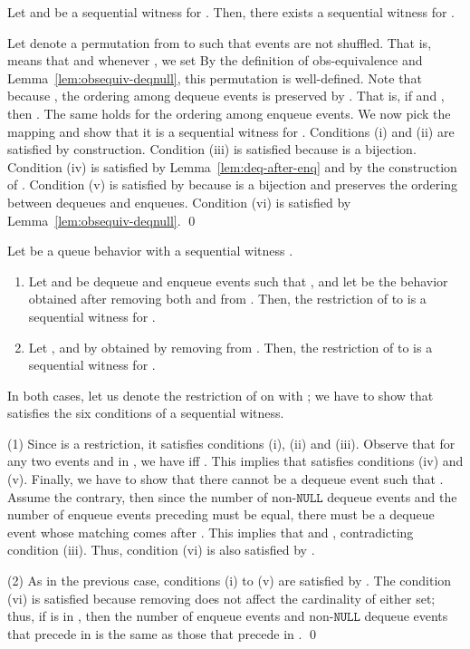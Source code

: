 \documentclass{LMCS}
\newcommand{\NULL}{\ensuremath{\mathtt{NULL}}}
\newcommand\mylabel[1]{\label{#1}}
\begin{document}
\begin{lem}\mylabel{lem:obsequiv-witness}
Let  and  be a sequential witness for .
Then, there exists a sequential witness for .
\end{lem}
\proof
Let  denote a permutation from  to  such that  events are not shuffled.
That is,  means that  and whenever , we set  By the definition of obs-equivalence and Lemma~\ref{lem:obsequiv-deqnull}, this permutation is well-defined.
Note that because , the ordering among dequeue events is preserved by .
That is, if  and , then .
The same holds for the ordering among enqueue events.
We now pick the mapping  and show that it is a sequential witness for .
Conditions (i) and (ii) are satisfied by construction.
Condition (iii) is satisfied because  is a bijection.
Condition (iv) is satisfied by Lemma~\ref{lem:deq-after-enq} and by the construction of .
Condition (v) is satisfied by because  is a bijection and preserves the ordering between dequeues and enqueues.
Condition (vi) is satisfied by Lemma~\ref{lem:obsequiv-deqnull}.
\qed

\begin{lem}\mylabel{lem:seqwit-removals}
Let  be a queue behavior with a sequential witness .
\begin{enumerate}
\item Let  and  be dequeue and enqueue events such that , and 
let  be the behavior obtained after removing both  and  from . 
Then, the restriction of  to  is a sequential witness for .
\item Let , and  by obtained by removing  from .
Then, the restriction of  to  is a sequential witness for .
\end{enumerate}
\end{lem}
\proof
In both cases, let us denote the restriction of  on  with ; 
we have to show that  satisfies the six conditions of a sequential witness.

(1)
Since  is a restriction, it satisfies conditions (i), (ii) and (iii).
Observe that for any two events  and  in , we have  iff .
This implies that  satisfies conditions (iv) and (v).
Finally, we have to show that there cannot be a dequeue event  such that .
Assume the contrary, then since the number of non-{\NULL} dequeue events and the number of enqueue events preceding  must be equal, there must be a dequeue event  whose matching  comes after .
This implies that  and , contradicting condition (iii).
Thus, condition (vi) is also satisfied by .

(2)
As in the previous case, conditions (i) to (v) are satisfied by .
The condition (vi) is satisfied because removing  does not affect the cardinality of either set; thus, if  is in , then the number of enqueue events and non-{\NULL} dequeue events that precede  in  is the same as those that precede  in .
\qed
\end{document}
